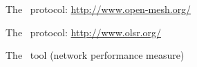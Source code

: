 \documentclass{article}
\begin{document}
\begin{thebibliography}{99}

     The \batman\ protocol:
    \url{http://www.open-mesh.org/}

     The \olsr\ protocol:
    \url{http://www.olsr.org/}

     The \netperf\ tool (network performance
    measure)

%
%

\end{thebibliography}
\end{document}
